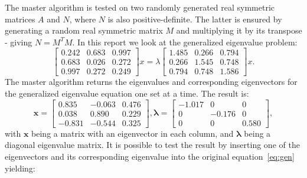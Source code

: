 \documentclass[12pt]{article}
\begin{document}
The master algorithm is tested on two randomly generated real symmetric matrices $A$ and $N$, where $N$ is also positive-definite. The latter is ensured by generating a random real symmetric matrix $M$ and multiplying it by its transpose - giving $N  = M^TM$. In this report we look at the generalized eigenvalue problem:
\begin{equation}
    \begin{bmatrix}
    0.242 &0.683 &0.997\\
    0.683 &0.026 &0.272\\
    0.997 &0.272 &0.249
    \end{bmatrix} x = \lambda 
    \begin{bmatrix}
    1.485 &0.266 &0.794\\
    0.266 &1.545 &0.748\\
    0.794 &0.748 &1.586
    \end{bmatrix} x.
\end{equation}
The master algorithm returns the eigenvalues and corresponding eigenvectors for the generalized eigenvalue equation one set at a time. The result is:
\begin{equation}
    \mathbf{x} = \begin{bmatrix}
    0.835 &-0.063 &0.476\\
    0.038 &0.890 &0.229\\
    -0.831 &-0.544 &0.325
    \end{bmatrix}, \boldsymbol{\lambda} = \begin{bmatrix}
    -1.017 &0 &0\\
    0 &-0.176 &0\\
    0 &0 &0.580 
    \end{bmatrix},
\end{equation}
with $\mathbf{x}$ being a matrix with an eigenvector in each column, and $\boldsymbol{\lambda}$ being a diagonal eigenvalue matrix. It is possible to test the result by inserting one of the eigenvectors and its corresponding eigenvalue into the original equation~\ref{eq:gen} yielding:
\end{document}
